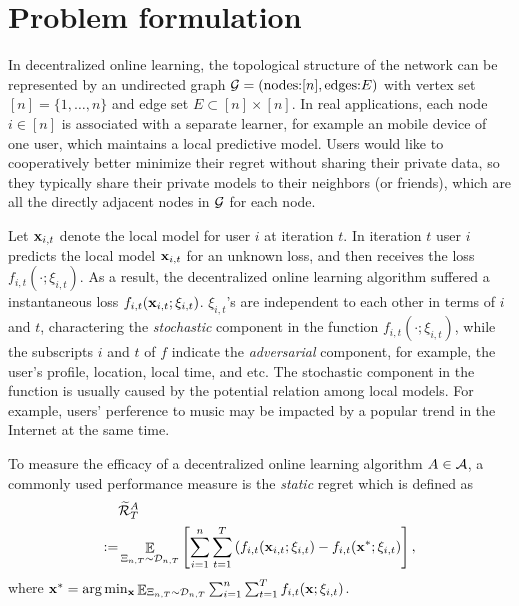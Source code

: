 \documentclass{article}
\begin{document}
\section{Problem formulation}
In decentralized online learning, the topological structure of the network can be represented by an undirected graph ${\mathcal{G}}=(\text{nodes:} [n], \text{edges:} E)$ with vertex set $[n]=\{1,\ldots,n\}$ and edge set $E\subset [n]\times [n]$. 
In real applications, each node $i\in [n]$ is associated with a separate learner, for example an mobile device of one user, which maintains a local predictive model.
Users would like to cooperatively better minimize their regret without sharing their private data, so they typically share their private models to their neighbors (or friends), which are all the directly adjacent nodes in ${\mathcal{G}}$ for each node. 

Let ${\bf x}_{i, t}$ denote the local model for user $i$ at iteration $t$. 
In iteration $t$ user $i$ predicts the local model ${\bf x}_{i,t}$ for an unknown loss, and then receives the loss $f_{i,t}(\cdot; \xi_{i,t})$. As a result, the decentralized online learning algorithm suffered a instantaneous loss $f_{i,t}({\bf x}_{i,t}; \xi_{i,t})$.
$\xi_{i,t}$'s are independent to each other in terms of $i$ and $t$, charactering the \emph{stochastic} component in the function $f_{i,t}(\cdot; \xi_{i,t})$, while the subscripts $i$ and $t$ of $f$ indicate the \emph{adversarial} component, for example, the user's profile, location, local time, and etc. The stochastic component in the function is usually caused by the potential relation among local models. For example, users' perference to music may be impacted by a popular trend in the Internet at the same time.

To measure the efficacy of a decentralized online learning algorithm $A\in{\mathcal{A}}$, a commonly used performance measure is the  \emph{static} regret which is defined as
\begin{align}
\label{equa_definition_static_regret}
& \widetilde{{\mathcal{R}}}_T^{A} \\ \nonumber 
:= & \mathop{\mathbb{E}}_{ \Xi_{n,T} \sim \mathcal{D}_{n,T} }  \left[\sum_{i=1}^n\sum_{t=1}^T \left( f_{i,t}({\bf x}_{i,t};\xi_{i,t}) - f_{i,t}({\bf x}^\ast;\xi_{i,t} \right) \right],
\end{align} 
where ${\bf x}^\ast=\arg \min_{\bf x} \mathop{\mathbb{E}}_{ \Xi_{n,T} \sim \mathcal{D}_{n,T} }  \sum_{i=1}^n\sum_{t=1}^T f_{i,t}({\bf x};\xi_{i,t}) $.
\end{document}
